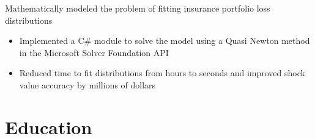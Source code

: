 \documentclass[10pt,a4paper,sans]{moderncv}        %
\begin{document}

{Mathematically modeled the problem of fitting insurance portfolio loss distributions
\begin{itemize}
	\item Implemented a C\# module to solve the model using a Quasi Newton method in the Microsoft Solver Foundation API
	\item Reduced time to fit distributions from hours to seconds and improved shock value accuracy by millions of dollars
\end{itemize}}




\section{Education}


\end{document}
